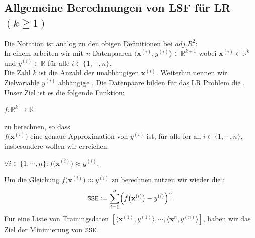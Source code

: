 \documentclass[12pt]{article}
\begin{document}
\subsection{Allgemeine Berechnungen von LSF für LR $(k \geqq 1)$}
%
Die Notation ist analog zu den obigen Definitionen bei $adj.R^2$:\\
In einem {\color{blue}{Linearen Regression (LR) Problem}} arbeiten wir mit $n$ Datenpaaren $\langle\mathbf{x}^{(i)}, y^{(i)} \rangle \in \mathbb{R}^{k+1} $ 
wobei $\mathbf{x}^{(i)} \in \mathbb{R}^k$ und $y^{(i)} \in \mathbb{R}$ für alle $i \in \{1,\cdots,n\}$.  \\
Die Zahl $k$ ist die Anzahl der unabhängigen {\color{blue}{Features ("Prädiktoren")}} $ \mathbf{x}^{(i)} $. Weiterhin nennen wir Zielvariable $ y^{(i)}$ abhängige {\color{blue}{Zielvariable ("target column")}}. Die Datenpaare bilden für das LR Problem die {\color{blue}{Trainings-Menge}}. Unser Ziel ist es die folgende Funktion:  
\\[0.2cm]
\hspace*{1.3cm}
\begin{large}
$ f:\mathbb{R}^k \rightarrow \mathbb{R}$ 
\end{large} 
zu berechnen, so dass 
\\[0.2cm]  
$ f \bigl(\mathbf{x}^{(i)}\bigr)$ eine  genaue Approximation von $y^{(i)}$ ist, für alle for all $i\in\{1,\cdots,n\}$, insbesondere wollen wir erreichen: \\[0.3cm]
\hspace*{1.3cm}
\begin{large}
$\forall i\in\{1,\cdots,n\}:f \bigl(\mathbf{x}^{(i)}\bigr) \approx y^{(i)}$. \\[0.4cm]
\end{large}
%
Um die Gleichung $ f\bigl(\mathbf{x}^{(i)}\bigr) \approx y^{(i)}$ zu berechnen nutzen wir wieder die {\color{blue}{Summe der  quadratischen Fehler "Sum of Squared Errors"}}: 
\begin{equation}
  \label{eq:squared-error-1}
  \mathtt{SSE} := \sum\limits_{i=1}^{n} \Bigl(f\bigl(\mathbf{x}^{(i)}\bigr) - y^{(i)}\Bigr)^2. 
\end{equation}
Für eine Liste von Trainingsdaten $[\langle \mathbf{x}^{(1)}, y^{(1)} \rangle, \cdots, \langle \mathbf{x}^{n}, y^{(n)} \rangle] $, haben wir das Ziel der Minimierung von $\mathtt{SSE}$.
%
\end{document}
